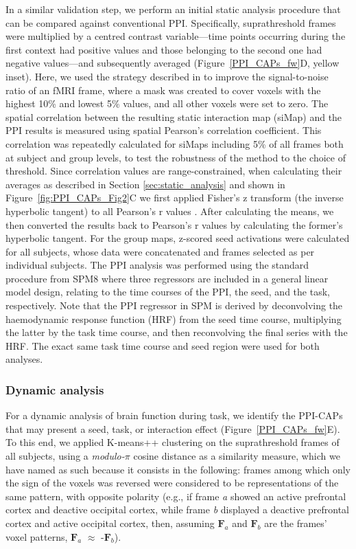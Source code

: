 In a similar validation step, we perform an initial static analysis procedure that can be compared against conventional PPI. Specifically, suprathreshold frames were multiplied by a centred contrast variable---time points occurring during the first context had positive values and those belonging to the second one had negative values---and subsequently averaged (Figure~\ref{PPI_CAPs_fw}D, yellow inset). Here, we used the strategy described in \citet{Liu2013} to improve the signal-to-noise ratio of an fMRI frame, where a mask was created to cover voxels with the highest 10\% and lowest 5\% values, and all other voxels were set to zero. The spatial correlation between the resulting static interaction map (siMap) and the PPI results is measured using spatial Pearson’s correlation coefficient. This correlation was repeatedly calculated for siMaps including 5\% of all frames both at subject and group levels, to test the robustness of the method to the choice of threshold. Since correlation values are range-constrained, when calculating their averages as described in Section \ref{sec:static_analysis} and shown in Figure~\ref{fig:PPI_CAPs_Fig2}C we first applied Fisher's z transform (the inverse hyperbolic tangent) to all Pearson's r values \citep{Cox2008}. After calculating the means, we then converted the results back to Pearson's r values by calculating the former's hyperbolic tangent. For the group maps, z-scored seed activations were calculated for all subjects, whose data were concatenated and frames selected as per individual subjects.    The PPI analysis was performed using the standard procedure from  SPM8 where three regressors are included in a general linear model design, relating to the time courses of the PPI, the seed, and the task, respectively. Note that the PPI regressor in SPM is derived by deconvolving the haemodynamic response function (HRF) from the seed time course, multiplying the latter by the task time course, and then reconvolving the final series with the HRF. The exact same task time course and seed region were used for both analyses.

\subsubsection{Dynamic analysis} \label{sectionKmeans}
For a dynamic analysis of brain function during task, we identify the PPI-CAPs that may present a seed, task, or interaction effect (Figure~\ref{PPI_CAPs_fw}E). To this end, we applied  K-means++ clustering on the suprathreshold frames of all subjects, using a \textit{modulo-$\pi$} cosine distance as a similarity measure, which we have named as such because it consists in the following: frames among which only the sign of the voxels was reversed were considered to be representations of the same pattern, with opposite polarity (e.g., if frame \textit{a} showed an active prefrontal cortex and deactive occipital cortex, while frame \textit{b} displayed a deactive prefrontal cortex and active occipital cortex, then, assuming {$\mathbf{F}_a$} and {$\mathbf{F}_b$} are the frames' voxel patterns, {$\mathbf{F}_a$} $\approx$ -{$\mathbf{F}_b$}). 


